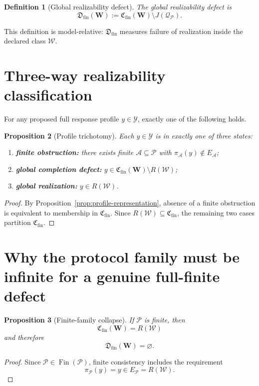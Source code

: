 \documentclass[11pt]{article}
\newtheorem{definition}{Definition}[section]
\newtheorem{proposition}[definition]{Proposition}
\newcommand{\W}{\mathcal W}
\newcommand{\Pcal}{\mathcal P}
\newcommand{\Acal}{\mathcal A}
\newcommand{\Y}{\mathcal Y}
\newcommand{\Fin}{\operatorname{Fin}}
\newcommand{\Cfin}{\mathfrak C_{\mathrm{fin}}}
\newcommand{\Dfin}{\mathfrak D_{\mathrm{fin}}}
\begin{document}
\begin{definition}[Global realizability defect]
The \emph{global realizability defect} is
\[
\Dfin(\mathbf W)
:=
\Cfin(\mathbf W)\setminus J(\mathcal Q_{\Pcal}).
\]
\end{definition}

This definition is model-relative: $\Dfin$ measures failure of realization
inside the declared class $\W$.

\section{Three-way realizability classification}

For any proposed full response profile $y\in\Y$, exactly one of the following
holds.

\begin{proposition}[Profile trichotomy]
Each $y\in\Y$ is in exactly one of three states:
\begin{enumerate}[label=(\roman*)]
\item \textbf{finite obstruction:} there exists finite $\Acal\subseteq\Pcal$
with $\pi_{\Acal}(y)\notin E_{\Acal}$;
\item \textbf{global completion defect:}
$y\in\Cfin(\mathbf W)\setminus R(\W)$;
\item \textbf{global realization:} $y\in R(\W)$.
\end{enumerate}
\end{proposition}

\begin{proof}
By Proposition~\ref{prop:profile-representation}, absence of a finite
obstruction is equivalent to membership in $\Cfin$. Since
$R(\W)\subseteq\Cfin$, the remaining two cases partition $\Cfin$.
\end{proof}

\section{Why the protocol family must be infinite for a genuine full-finite defect}

\begin{proposition}[Finite-family collapse]\label{prop:finite-collapse}
If $\Pcal$ is finite, then
\[
\Cfin(\mathbf W)=R(\W)
\]
and therefore
\[
\Dfin(\mathbf W)=\varnothing.
\]
\end{proposition}

\begin{proof}
Since $\Pcal\in\Fin(\Pcal)$, finite consistency includes the requirement
\[
\pi_{\Pcal}(y)=y\in E_{\Pcal}=R(\W).
\]
\end{proof}
\end{document}
